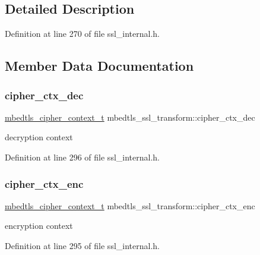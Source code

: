 \subsection{Detailed Description}


Definition at line 270 of file ssl\+\_\+internal.\+h.



\subsection{Member Data Documentation}
\mbox{\label{structmbedtls__ssl__transform_a8f7e9c4b90dda8083df54037e5be955e}} 
\subsubsection{\texorpdfstring{cipher\+\_\+ctx\+\_\+dec}{cipher\_ctx\_dec}}
{\footnotesize\ttfamily \mbox{\hyperlink{structmbedtls__cipher__context__t}{mbedtls\+\_\+cipher\+\_\+context\+\_\+t}} mbedtls\+\_\+ssl\+\_\+transform\+::cipher\+\_\+ctx\+\_\+dec}

decryption context 

Definition at line 296 of file ssl\+\_\+internal.\+h.

\mbox{\label{structmbedtls__ssl__transform_a4a1c49f6f40086491dd8dd059f163a61}} 
\subsubsection{\texorpdfstring{cipher\+\_\+ctx\+\_\+enc}{cipher\_ctx\_enc}}
{\footnotesize\ttfamily \mbox{\hyperlink{structmbedtls__cipher__context__t}{mbedtls\+\_\+cipher\+\_\+context\+\_\+t}} mbedtls\+\_\+ssl\+\_\+transform\+::cipher\+\_\+ctx\+\_\+enc}

encryption context 

Definition at line 295 of file ssl\+\_\+internal.\+h.

